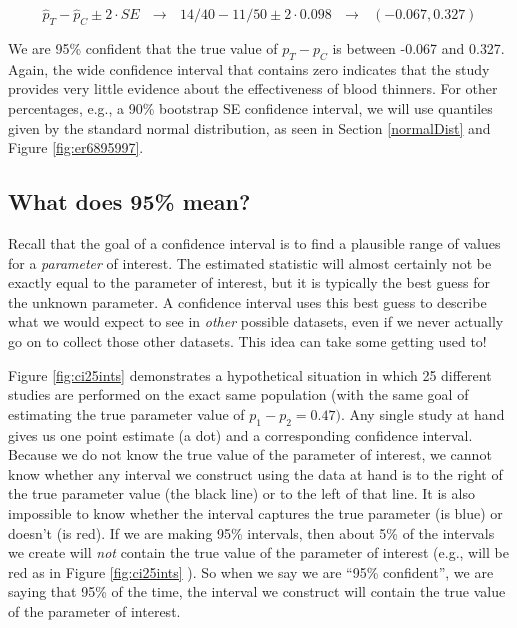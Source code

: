 \documentclass[
  10pt,
  openany]{book}
\begin{document}
\[\hat{p}_T - \hat{p}_C \pm 2 \cdot SE \ \ \ \rightarrow \ \ \ 14/40 - 11/50 \pm 2 \cdot 0.098 \ \ \  \rightarrow \ \ \  (-0.067, 0.327)\]

We are 95\% confident that the true value of \(p_T - p_C\) is between -0.067 and 0.327.
Again, the wide confidence interval that contains zero indicates that the study provides very little evidence about the effectiveness of blood thinners.
For other percentages, e.g., a 90\% bootstrap SE confidence interval, we will use quantiles given by the standard normal distribution, as seen in Section \ref{normalDist} and Figure \ref{fig:er6895997}.

\hypertarget{what-does-95-mean}{%
\subsection{What does 95\% mean?}\label{what-does-95-mean}}

Recall that the goal of a confidence interval is to find a plausible range of values for a \emph{parameter} of interest.
The estimated statistic will almost certainly not be exactly equal to the parameter of interest, but it is typically the best guess for the unknown parameter.
A confidence interval uses this best guess to describe what we would expect to see in \emph{other} possible datasets, even if we never actually go on to collect those other datasets.
This idea can take some getting used to!

Figure \ref{fig:ci25ints} demonstrates a hypothetical situation in which 25 different studies are performed on the exact same population (with the same goal of estimating the true parameter value of \(p_1 - p_2 = 0.47).\) Any single study at hand gives us one point estimate (a dot) and a corresponding confidence interval.
Because we do not know the true value of the parameter of interest, we cannot know whether any interval we construct using the data at hand is to the right of the true parameter value (the black line) or to the left of that line.
It is also impossible to know whether the interval captures the true parameter (is blue) or doesn't (is red).
If we are making 95\% intervals, then about 5\% of the intervals we create will \emph{not} contain the true value of the parameter of interest (e.g., will be red as in Figure \ref{fig:ci25ints} ).
So when we say we are ``95\% confident'', we are saying that 95\% of the time, the interval we construct will contain the true value of the parameter of interest.

\clearpage
\end{document}
